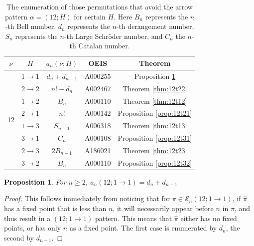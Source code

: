 \documentclass[11pt]{article}
\renewcommand\S{\mathcal S}
\newtheorem{proposition}[theorem]{Proposition}
\theoremstyle{definition}
\begin{document}
\renewcommand{\arraystretch}{1.2}
\begin{table}[H]
    \centering
    \begin{tabular}{|c|c|c|c|c|} 
    \hline
         $\nu$ & $H$ & $a_n(\nu;H)$  & OEIS & Theorem \\ \hline\hline
        \multirow{9}{*}{12}  
         & $1\to1$ 
        & $d_n+d_{n-1}$& A000255  &Proposition \ref{prop:12t11} \\ \cline{2-5}
           & $2\to2$ 
        & $n!-d_n$& A002467  &Theorem \ref{thm:12t22} \\ \cline{2-5}
        & $1\to2$ 
        &  $B_n$  & A000110 &Theorem \ref{thm:12t12}\\ \cline{2-5}
           & $2\to1$ 
        & $n!$ & A000142 &Proposition \ref{prop:12t21}  \\ \cline{2-5}
           & $1\to3$ 
        & $S_{n-1}$  & A006318 &Theorem \ref{thm:12t13} \\ \cline{2-5}
           & $3\to1$ 
        &  $C_n$ &  A000108 &Proposition \ref{prop:12t31} \\ \cline{2-5}
           & $2\to3$ 
        & $2B_{n-1}$& A186021 &Theorem \ref{thm:12t23} \\ \cline{2-5}
           & $3\to2$ 
        & $B_n$ & A000110 &Proposition \ref{prop:12t32} \\  \hline 
    \end{tabular}
    \caption{The enumeration of those permutations that avoid the arrow pattern $\alpha=(12;H)$ for certain $H$. Here $B_n$ represents the $n$-th Bell number, $d_n$ represents the $n$-th derangement number, $S_n$ represents the $n$-th Large Schr\"oder number, and $C_n$ the $n$-th Catalan number.}
    \label{tab: 12}
\end{table}

\begin{proposition} \label{prop:12t11}
    For $n\geq 2$, $a_n(12; 1 \to 1) = d_n + d_{n-1}$
\end{proposition}


\begin{proof}
    This follows immediately from noticing that for $\pi \in \S_n(12;1\to1)$, if $\hat\pi$ has a fixed point that is less than $n$, it will necessarily appear before $n$ in $\pi$, and thus result in a $(12; 1\to1)$ pattern. This means that $\hat\pi$ either has no fixed points, or has only $n$ as a fixed point. The first case is enumerated by $d_n$, the second by $d_{n-1}$.
\end{proof}
\end{document}
